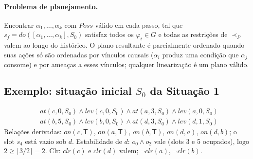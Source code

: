 \documentclass[11pt,a4paper]{article}
\newcommand{\At}{\mathit{at}}
\newcommand{\Lev}{\mathit{lev}}
\newcommand{\Clr}{\mathit{clr}}
\newcommand{\On}{\mathit{on}}
\newcommand{\Poss}{\mathit{Poss}}
\newcommand{\Do}{\mathit{do}}
\newcommand{\Mesa}{\mathsf{T}}
\begin{document}
\paragraph{Problema de planejamento.}
Encontrar $\alpha_1,\dots,\alpha_k$ com $\Poss$ válido em cada passo, tal que $s_f=\Do([\alpha_1,\dots,\alpha_k],S_0)$ satisfaz todos os $\varphi_i\in G$ e todas as restrições de $\prec_P$ valem ao longo do histórico. O plano resultante é parcialmente ordenado quando suas ações só são ordenadas por vínculos causais ($\alpha_i$ produz uma condição que $\alpha_j$ consome) e por ameaças a esses vínculos; qualquer linearização é um plano válido.

\subsection{Exemplo: situação inicial \texorpdfstring{$S_0$}{S0} da Situação 1}

\begin{align*}
&\At(c,0,S_0)\wedge\Lev(c,0,S_0)\wedge\At(a,3,S_0)\wedge\Lev(a,0,S_0)\\
&\At(b,5,S_0)\wedge\Lev(b,0,S_0)\wedge\At(d,3,S_0)\wedge\Lev(d,1,S_0)
\end{align*}
Relações derivadas: $\On(c,\Mesa)$, $\On(a,\Mesa)$, $\On(b,\Mesa)$, $\On(d,a)$, $\On(d,b)$; o slot $s_4$ está vazio sob $d$. Estabilidade de $d$: $o_0\wedge o_2$ vale (slots 3 e 5 ocupados), logo $2\ge\lceil 3/2\rceil=2$. Clr: $\Clr(c)$ e $\Clr(d)$ valem; $\neg\Clr(a)$, $\neg\Clr(b)$.
\end{document}
